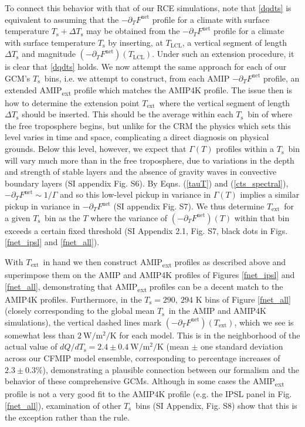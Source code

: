 \documentclass[9pt,twocolumn,twoside,lineno]{pnas-new}
\newcommand{\eqnref}[1]{(\ref{#1})}
\newcommand{\ppt}{\ensuremath{\partial_T}}
\newcommand{\Fnet}{\ensuremath{F^\mathrm{net}}}
\newcommand{\WmsqK}{\ensuremath{\mathrm{W/m^2/K}}}
\newcommand{\Ts}{\ensuremath{T_\mathrm{s}}}
\newcommand{\Tlcl}{\ensuremath{T_\mathrm{LCL}}}
\newcommand{\Text}{\ensuremath{T_\mathrm{ext}}}
\begin{document}
To connect this behavior with that of our RCE simulations, note that \eqref{dqdts} is equivalent to assuming that the $-\ppt \Fnet$ profile for  a climate with surface temperature $\Ts + \Delta \Ts$ may be obtained from the $-\ppt \Fnet$ profile for  a climate with surface temperature $\Ts$  by inserting, at \Tlcl, a vertical segment of length $\Delta \Ts$ and magnitude $(-\ppt \Fnet)(\Tlcl)$. Under such an extension procedure, it is clear that \eqref{dqdts} holds. We now attempt the same approach for each of our GCM's \Ts\ bins, i.e. we attempt to construct, from each AMIP $-\ppt \Fnet$ profile, an extended AMIP\textsubscript{ext} profile which matches the AMIP4K profile. The issue then is how to determine the extension point \Text\  where the vertical segment of length $\Delta \Ts$ should be inserted. This should be the average within each \Ts\ bin of where the free troposphere begins, but unlike for the CRM the physics which sets this level varies in time and space, complicating a direct diagnosis on physical grounds. Below this level, however, we expect that $\Gamma(T)$ profiles within a \Ts\ bin will vary much more than in the free troposphere,  due to variations in the depth and strength of stable layers  and the absence of gravity waves in convective boundary layers (SI appendix Fig. S6).  By Eqns. \eqnref{tauT} and \eqnref{cts_spectral}, $-\ppt\Fnet \sim 1/\Gamma$ and so this low-level pickup in variance in $\Gamma(T)$  implies a similar pickup in variance in $-\ppt \Fnet$ (SI appendix Fig. S7). We thus determine \Text\ for a given \Ts\ bin as the $T$ where the variance of $(-\ppt \Fnet)(T)$ within that bin exceeds a certain fixed threshold (SI Appendix 2.1, Fig. S7,  black dots in Figs. \ref{fnet_ipsl} and  \ref{fnet_all}). 

With \Text\ in hand we then construct AMIP\textsubscript{ext} profiles as described above and superimpose them on the AMIP and AMIP4K profiles of Figures \ref{fnet_ipsl} and  \ref{fnet_all}, demonstrating that AMIP\textsubscript{ext} profiles can be a decent match to the AMIP4K profiles. Furthermore, in the $\Ts=290,\ 294$ K bins of Figure \ref{fnet_all} (closely corresponding to the global mean \Ts\ in the AMIP and AMIP4K simulations), the vertical dashed lines mark $(-\ppt\Fnet)(\Text)$, which we see is somewhat less than $2 \ \WmsqK$ for each model. This is in the neighborhood of the actual value of $dQ/d\Ts = 2.4 \pm 0.4\ \WmsqK$ (mean $\pm$ one standard deviation across our CFMIP model ensemble, corresponding to percentage increases of $2.3 \pm 0.3 \%$), demonstrating a plausible connection  between our  formalism and the behavior of these comprehensive GCMs. Although in some cases the AMIP\textsubscript{ext} profile is not a very good fit to the AMIP4K profile (e.g. the IPSL panel in Fig. \ref{fnet_all}),  examination of other \Ts\ bins (SI Appendix, Fig. S8) show that this is the exception rather than the rule.
\end{document}
